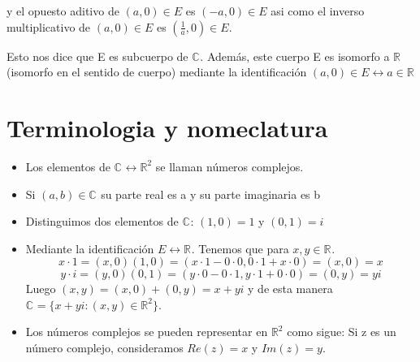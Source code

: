 y el opuesto aditivo de \( (a,0) \in E\) es \( (-a,0) \in E\) asi como el inverso multiplicativo de  \( (a,0) \in E\) es \( (\frac{1}{a},0) \in E\).

Esto nos dice que E es subcuerpo de \(\mathbb{C}^{}\). Además, este cuerpo E es isomorfo a \(\mathbb{R}^{}\) (isomorfo en el sentido de cuerpo) mediante la identificación \((a,0) \in E \leftrightarrow a \in \mathbb{R}^{}\)

\section{Terminologia y nomeclatura}

\begin{itemize}
  \item Los elementos de \(\mathbb{C}^{} \leftrightarrow \mathbb{R}^{2}\) se llaman números complejos.
  \item Si \((a,b) \in \mathbb{C}^{} \) su parte real es a y su parte imaginaria es b
  \item Distinguimos dos elementos de \(\mathbb{C}^{}\): \((1,0) = 1\) y \((0,1) = i\)
  \item Mediante la identificación \( E \leftrightarrow \mathbb{R}^{}\). Tenemos que para \(x,y \in \mathbb{R}^{}\).
\[ x\cdot 1=(x,0)(1,0)=(x \cdot 1-0\cdot0, 0\cdot1+x\cdot0)=(x,0)=x \]
\[ y\cdot i=(y,0)(0,1)=(y \cdot 0-0\cdot1, y\cdot1+0\cdot0)=(0,y)=yi \]
Luego \((x,y) = (x,0)+(0,y) = x + yi\) y de esta manera \(\mathbb{C}^{} = \{x+yi : (x,y) \in \mathbb{R}^{2}\}\).
  \item Los números complejos se pueden representar en \(\mathbb{R}^{2}\) como sigue:
Si z es un número complejo, consideramos \(Re(z) = x\) y \(Im(z) = y\).
\end{itemize}

\begin{center} %
\end{center}

